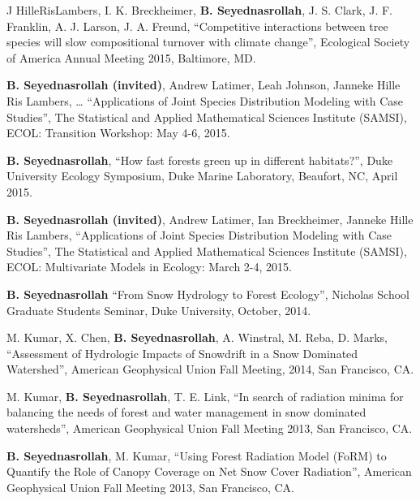 \documentclass[10pt]{article}
\newenvironment{changemargin}[2]{%
  \begin{list}{}{%
    \setlength{\topsep}{0pt}%
    \setlength{\leftmargin}{#1}%
    \setlength{\rightmargin}{#2}%
    \setlength{\listparindent}{\parindent}%
    \setlength{\itemindent}{\parindent}%
    \setlength{\parsep}{\parskip}%
  }%
  \item[]}{\end{list}
}
\newenvironment{body} {
	\vspace*{-2pt}
	\begin{changemargin}{-0.5in}{-0.5in}
  }
	{\end{changemargin}
}
\begin{document}
\begin{body}
   J HilleRisLambers, I. K. Breckheimer, \textbf{B. Seyednasrollah}, J. S. Clark, J. F. Franklin, A. J. Larson, J. A. Freund, ``Competitive interactions between tree species will slow compositional turnover with climate change'', Ecological Society of America Annual Meeting 2015, Baltimore, MD.\\
\medskip

   \textbf{B. Seyednasrollah (invited)}, Andrew Latimer, Leah Johnson, Janneke Hille Ris Lambers, … ``Applications of Joint Species Distribution Modeling with Case Studies'', The Statistical and Applied Mathematical Sciences Institute (SAMSI), ECOL: Transition Workshop: May 4-6, 2015.\\
  \medskip

   \textbf{B. Seyednasrollah}, ``How fast forests green up in different habitats?'', Duke University Ecology Symposium, Duke Marine Laboratory, Beaufort, NC, April 2015.\\
\medskip

   \textbf{B. Seyednasrollah (invited)}, Andrew Latimer, Ian Breckheimer, Janneke Hille Ris Lambers, ``Applications of Joint Species Distribution Modeling with Case Studies'', The Statistical and Applied Mathematical Sciences Institute (SAMSI), ECOL: Multivariate Models in Ecology: March 2-4, 2015.\\
  \medskip

 \textbf{B. Seyednasrollah} ``From Snow Hydrology to Forest Ecology'', Nicholas School Graduate Students Seminar, Duke University, October, 2014.\\
\medskip

   M. Kumar, X. Chen, \textbf{B. Seyednasrollah}, A. Winstral, M. Reba, D. Marks, ``Assessment of Hydrologic Impacts of Snowdrift in a Snow Dominated Watershed'', American Geophysical Union Fall Meeting, 2014, San Francisco, CA.\\
\medskip

   M. Kumar, \textbf{B. Seyednasrollah}, T. E. Link, ``In search of radiation minima for balancing the needs of forest and water management in snow dominated watersheds'', American Geophysical Union Fall Meeting 2013, San Francisco, CA.\\
\medskip

   \textbf{B. Seyednasrollah}, M. Kumar, ``Using Forest Radiation Model (FoRM) to Quantify the Role of Canopy Coverage on Net Snow Cover Radiation'', American Geophysical Union Fall Meeting 2013, San Francisco, CA.\\
\medskip


\end{body}
\end{document}
